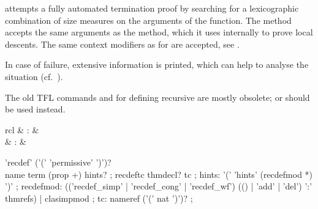 \begin{isabellebody}
\begin{isamarkuptext}
\begin{description}
  \item \hyperlink{method.HOL.lexicographic-order}{\mbox{}} attempts a fully
  automated termination proof by searching for a lexicographic
  combination of size measures on the arguments of the function. The
  method accepts the same arguments as the \hyperlink{method.auto}{\mbox{}} method,
  which it uses internally to prove local descents.  The same context
  modifiers as for \hyperlink{method.auto}{\mbox{}} are accepted, see
  .

  In case of failure, extensive information is printed, which can help
  to analyse the situation (cf.\ \cite{isabelle-function}).

  \end{description}%
\end{isamarkuptext}%
\isamarkuptrue%
%
\isamarkuptrue%
%
\begin{isamarkuptext}%
The old TFL commands \hyperlink{command.HOL.recdef}{\mbox{}} and \hyperlink{command.HOL.recdef-tc}{\mbox{}} for defining recursive are mostly obsolete; \hyperlink{command.HOL.function}{\mbox{}} or \hyperlink{command.HOL.fun}{\mbox{}} should be used instead.

  \begin{matharray}{rcl}
    \hypertarget{command.HOL.recdef}{\hyperlink{command.HOL.recdef}{\mbox{}}} & : &  \\
    \hypertarget{command.HOL.recdef-tc}{\hyperlink{command.HOL.recdef-tc}{\mbox{}}}\isa{{\isachardoublequote}\isactrlsup {\isacharasterisk}{\isachardoublequote}} & : &  \\
  \end{matharray}

  \begin{rail}
    'recdef' ('(' 'permissive' ')')? \\ name term (prop +) hints?
    ;
    recdeftc thmdecl? tc
    ;
    hints: '(' 'hints' (recdefmod *) ')'
    ;
    recdefmod: (('recdef\_simp' | 'recdef\_cong' | 'recdef\_wf') (() | 'add' | 'del') ':' thmrefs) | clasimpmod
    ;
    tc: nameref ('(' nat ')')?
    ;
  \end{rail}


\end{isamarkuptext}
\end{isabellebody}
